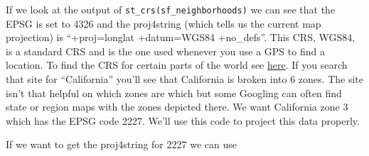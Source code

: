 \documentclass[
  12pt,
]{book}
\begin{document}
If we look at the output of \texttt{st\_crs(sf\_neighborhoods)} we can see that the EPSG is set to 4326 and the proj4string (which tells us the current map projection) is ``+proj=longlat +datum=WGS84 +no\_defs''. This CRS, WGS84, is a standard CRS and is the one used whenever you use a GPS to find a location. To find the CRS for certain parts of the world see \href{https://spatialreference.org/}{here}. If you search that site for ``California'' you'll see that California is broken into 6 zones. The site isn't that helpful on which zones are which but some Googling can often find state or region maps with the zones depicted there. We want California zone 3 which has the EPSG code 2227. We'll use this code to project this data properly.

If we want to get the proj4string for 2227 we can use
\end{document}
